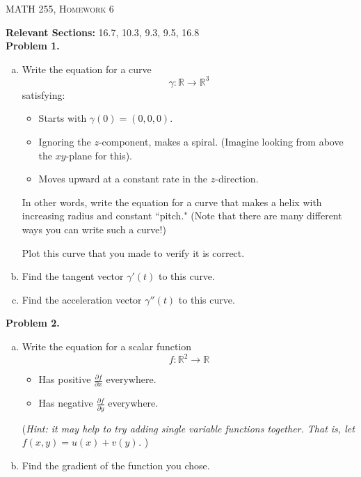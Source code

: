 \documentclass[12pt]{report} %
\newcommand{\R}{\mathbb{R}}
\theoremstyle{definition}
\begin{document}
\begin{center}
   \textsc{\large MATH 255, Homework 6}\\
\end{center}
\vspace{.5cm}

\noindent\textbf{Relevant Sections:} 16.7, 10.3, 9.3, 9.5, 16.8 \\

\noindent\textbf{Problem 1.} 
\begin{enumerate}[(a)]
    \item Write the equation for a curve 
    \[
    \gamma \colon \R \to \R^3
    \] 
    satisfying:
    \begin{itemize}
    \item Starts with $\gamma(0)=(0,0,0)$.
    \item Ignoring the $z$-component, makes a spiral. (Imagine looking from above the $xy$-plane for this).
    \item Moves upward at a constant rate in the $z$-direction.
\end{itemize}
In other words, write the equation for a curve that makes a helix with increasing radius and constant ``pitch." (Note that there are many different ways you can write such a curve!)

Plot this curve that you made to verify it is correct.
    \item Find the tangent vector $\gamma'(t)$ to this curve.
    \item Find the acceleration vector $\gamma''(t)$ to this curve.
\end{enumerate}


\vspace*{.5cm}

\noindent\textbf{Problem 2.} 
\begin{enumerate}[(a)]
    \item Write the equation for a scalar function
    \[
    f\colon \R^2 \to \R
    \]
    \begin{itemize}
        \item Has positive $\frac{\partial f}{\partial x}$ everywhere.
        \item Has negative $\frac{\partial f}{\partial y}$ everywhere.
    \end{itemize}
    (\emph{Hint: it may help to try adding single variable functions together. That is, let $f(x,y)=u(x)+v(y)$.}
    )
    \item Find the gradient of the function you chose.
\end{enumerate}
\vspace*{.5cm}
\end{document}
